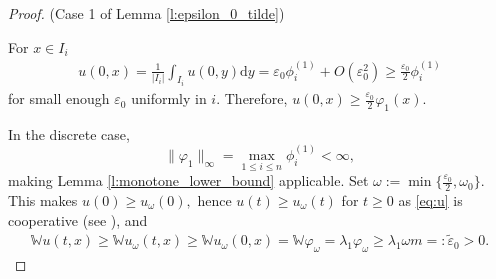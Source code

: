 \documentclass{article}
\renewcommand{\d}{\mathrm{d}}
\newcommand{\W}{\mathbb{W}}
\newcommand{\1}[1]{{\mathds{1}}_{\left\{#1\right\}}}
\begin{document}
\begin{proof} (Case 1 of Lemma \ref{l:epsilon_0_tilde})
	
	For $x \in I_i$
	\begin{align*}
		u(0,x)= \frac{1}{|I_i|} \int_{I_i} u(0,y) \d y=\varepsilon_0 \phi_{i}^{(1)} +O \left( \varepsilon_0^2 \right) \geq \frac{\varepsilon_0}{2}\phi_{i}^{(1)}
	\end{align*}
	for small enough $\varepsilon_0$ uniformly in $i$. Therefore, $u(0,x) \geq \frac{\varepsilon_0}{2} \varphi_1(x).$
	
	In the discrete case,
	$$\|\varphi_1 \|_{\infty} = \max_{1 \leq i \leq n} \phi_{i}^{(1)}<\infty,$$
	making Lemma \ref{l:monotone_lower_bound} applicable. Set $\omega:=\min \{\frac{\varepsilon_0}{2},\omega_0\}.$ This makes $u(0) \geq u_{\omega}(0),$ hence $u(t) \geq u_{\omega}(t)$ for $t \geq 0$ as \eqref{eq:u} is cooperative (see \cite[Proposition 2.7.]{SISdyn}), and
	\begin{align*}
		\W u(t,x) \geq \W u_{\omega}(t,x) \geq \W u_{\omega}(0,x)=\W \varphi_{\omega}=\lambda_{1} \varphi_{\omega} \geq \lambda_1 \omega m=: \tilde{\varepsilon}_0>0.
	\end{align*}
	
\end{proof}
\end{document}
